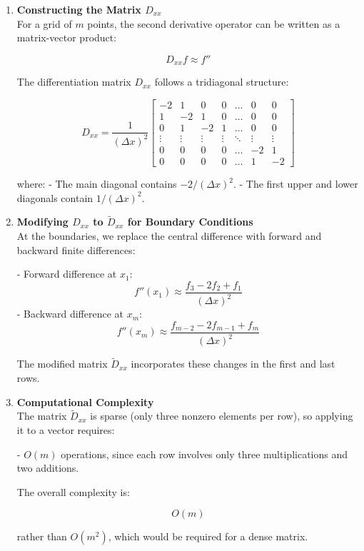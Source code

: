 \documentclass[12pt]{article}
\begin{document}
\begin{enumerate}
\begin{enumerate}
    \item \textbf{Constructing the Matrix \( D_{xx} \)} \\
    For a grid of \( m \) points, the second derivative operator can be written as a matrix-vector product:

    \[
    D_{xx} f \approx f''
    \]

    The differentiation matrix \( D_{xx} \) follows a tridiagonal structure:

    \[
    D_{xx} =
    \frac{1}{(\Delta x)^2}
    \begin{bmatrix}
    -2 & 1  & 0  & 0  & \dots & 0  & 0  \\
    1  & -2 & 1  & 0  & \dots & 0  & 0  \\
    0  & 1  & -2 & 1  & \dots & 0  & 0  \\
    \vdots & \vdots & \vdots & \vdots & \ddots & \vdots & \vdots \\
    0  & 0  & 0  & 0  & \dots & -2 & 1  \\
    0  & 0  & 0  & 0  & \dots & 1  & -2
    \end{bmatrix}
    \]

    where:
    - The main diagonal contains \( -2/(\Delta x)^2 \).
    - The first upper and lower diagonals contain \( 1/(\Delta x)^2 \).

    \item \textbf{Modifying \( D_{xx} \) to \( \tilde{D}_{xx} \) for Boundary Conditions} \\
    At the boundaries, we replace the central difference with forward and backward finite differences:

    - Forward difference at \( x_1 \):
      \[
      f''(x_1) \approx \frac{f_3 - 2f_2 + f_1}{(\Delta x)^2}
      \]
    - Backward difference at \( x_m \):
      \[
      f''(x_m) \approx \frac{f_{m-2} - 2f_{m-1} + f_m}{(\Delta x)^2}
      \]

    The modified matrix \( \tilde{D}_{xx} \) incorporates these changes in the first and last rows.

    \item \textbf{Computational Complexity} \\
    The matrix \( \tilde{D}_{xx} \) is sparse (only three nonzero elements per row), so applying it to a vector requires:

    - \( O(m) \) operations, since each row involves only three multiplications and two additions.

    The overall complexity is:

    \[
    O(m)
    \]

    rather than \( O(m^2) \), which would be required for a dense matrix.
\end{enumerate}

\end{enumerate}
\end{document}
